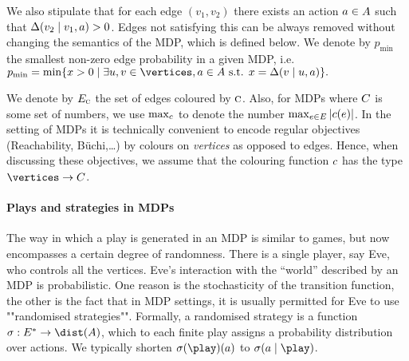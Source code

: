 We also stipulate that for each edge $(v_1,v_2)$ there exists an action $a\in A$ such that $\Delta(v_2\mid v_1,a)>0$. Edges not satisfying this can be always removed without changing the semantics of the MDP, which is defined below. We denote by $ p_{\min} $ the smallest non-zero edge probability in a given MDP, i.e. $ p_{\min} = \min\{x>0 \mid \exists u,v \in \vertices, a \in \actions \text{ s.t. } x = \probTranFunc(v\mid u,a)\}. $

We denote by $E_{\textsc{c}}$ the set of edges coloured by $\textsc{c}$. Also, for MDPs where $C$ is some set of numbers, we use $\max_{c}$ to denote the number $\max_{e\in 
	E}|c(e)|$.
In the setting of MDPs it is technically convenient to encode regular objectives (Reachability, B{\"u}chi,\dots) by colours on \emph{vertices} as opposed to edges. Hence, when discussing these objectives, we assume that the colouring function $c$ has the type $\vertices \rightarrow \colours$.



\paragraph{Plays and strategies in MDPs}


 The way in which a play is generated in an MDP is similar to games, but now encompasses a certain degree of randomness. There is a single player, say Eve, who controls all the vertices. Eve's interaction with the ``world'' described by an MDP is probabilistic. One reason is the stochasticity of the transition function, the other is the fact that in MDP settings, it is usually permitted for Eve to use ""randomised strategies"". Formally, a randomised strategy is a function $\sigma : E^* \to \dist(A)$, which to each finite play assigns a probability distribution over actions. 
 We typically shorten $\sigma(\play)(a)$ to $\sigma(a\mid \play)$.
 
